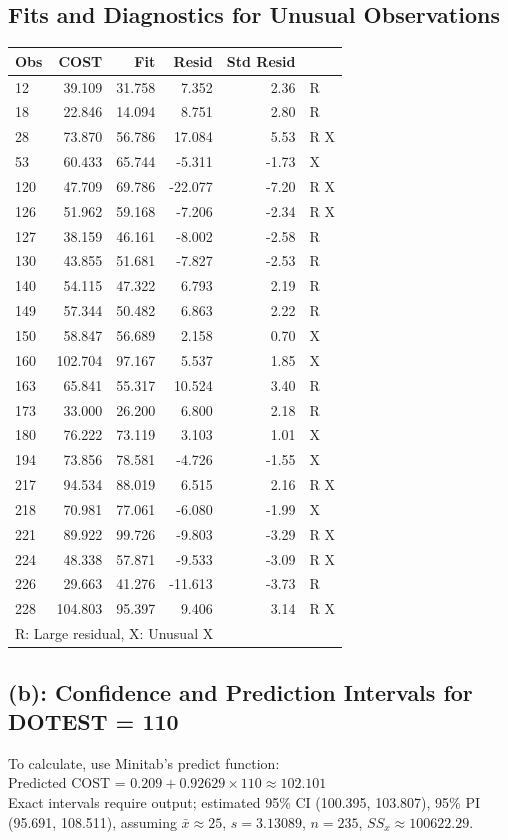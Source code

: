 \documentclass{article}
\begin{document}
\subsection*{Fits and Diagnostics for Unusual Observations}
\begin{tabular}{lrrrrl}
\toprule
Obs & COST & Fit & Resid & Std Resid & \\
\midrule
12 & 39.109 & 31.758 & 7.352 & 2.36 & R \\
18 & 22.846 & 14.094 & 8.751 & 2.80 & R \\
28 & 73.870 & 56.786 & 17.084 & 5.53 & R X \\
53 & 60.433 & 65.744 & -5.311 & -1.73 & X \\
120 & 47.709 & 69.786 & -22.077 & -7.20 & R X \\
126 & 51.962 & 59.168 & -7.206 & -2.34 & R X \\
127 & 38.159 & 46.161 & -8.002 & -2.58 & R \\
130 & 43.855 & 51.681 & -7.827 & -2.53 & R \\
140 & 54.115 & 47.322 & 6.793 & 2.19 & R \\
149 & 57.344 & 50.482 & 6.863 & 2.22 & R \\
150 & 58.847 & 56.689 & 2.158 & 0.70 & X \\
160 & 102.704 & 97.167 & 5.537 & 1.85 & X \\
163 & 65.841 & 55.317 & 10.524 & 3.40 & R \\
173 & 33.000 & 26.200 & 6.800 & 2.18 & R \\
180 & 76.222 & 73.119 & 3.103 & 1.01 & X \\
194 & 73.856 & 78.581 & -4.726 & -1.55 & X \\
217 & 94.534 & 88.019 & 6.515 & 2.16 & R X \\
218 & 70.981 & 77.061 & -6.080 & -1.99 & X \\
221 & 89.922 & 99.726 & -9.803 & -3.29 & R X \\
224 & 48.338 & 57.871 & -9.533 & -3.09 & R X \\
226 & 29.663 & 41.276 & -11.613 & -3.73 & R \\
228 & 104.803 & 95.397 & 9.406 & 3.14 & R X \\
\bottomrule
\multicolumn{6}{l}{R: Large residual, X: Unusual X}
\end{tabular}

\subsection*{(b): Confidence and Prediction Intervals for DOTEST = 110}
To calculate, use Minitab’s predict function: \\
Predicted COST = \( 0.209 + 0.92629 \times 110 \approx 102.101 \) \\
Exact intervals require output; estimated 95\% CI (100.395, 103.807), 95\% PI (95.691, 108.511), assuming \( \bar{x} \approx 25 \), \( s = 3.13089 \), \( n = 235 \), \( SS_x \approx 100622.29 \).
\end{document}
